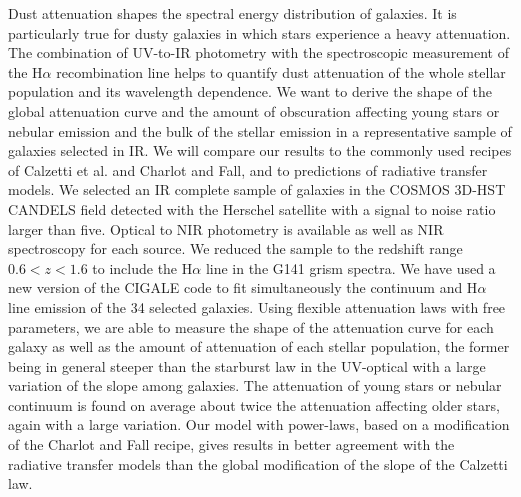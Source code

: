 \documentclass{aa}
\begin{document}
  \abstract
   {Dust attenuation shapes the spectral energy distribution of galaxies. It is particularly true for dusty galaxies in which stars experience a heavy attenuation. The combination of UV-to-IR photometry {with the spectroscopic measurement of the H$\alpha$ recombination line} helps to quantify  dust attenuation of the whole stellar population and its wavelength dependence.}
   {We want to derive the shape of the global attenuation curve and the amount of obscuration affecting young stars or nebular emission and the bulk of the stellar emission in a representative sample of galaxies selected in IR. We will compare our results to the commonly used recipes of Calzetti et al. and Charlot and Fall, and to predictions of radiative transfer models.  }
   {We selected an IR complete sample of galaxies in the COSMOS 3D-HST CANDELS field detected with the Herschel satellite with a signal to noise ratio larger than five. Optical to NIR photometry is available as well as NIR spectroscopy for each source. We reduced the sample to the redshift range $0.6 < z < 1.6$ to include the H$\alpha$ line in the G141 grism spectra. We have used a new version of the CIGALE code to fit simultaneously the continuum and H$\alpha$ line emission of the 34 selected galaxies.}
  {Using flexible attenuation laws with free parameters, we are able to measure the shape of the attenuation curve for each
galaxy as well as the amount of attenuation of each stellar population, the former being in general steeper than the starburst law in the
UV-optical with a large variation of the slope among galaxies. The attenuation of young stars or nebular continuum is found on average
about twice the attenuation affecting older stars, again with a large variation. Our model with power-laws, based on a modification
of the Charlot and Fall recipe, gives results in better agreement with the radiative transfer models than the global modification of the slope of the Calzetti law.}
   {}

   
   \maketitle
\end{document}
